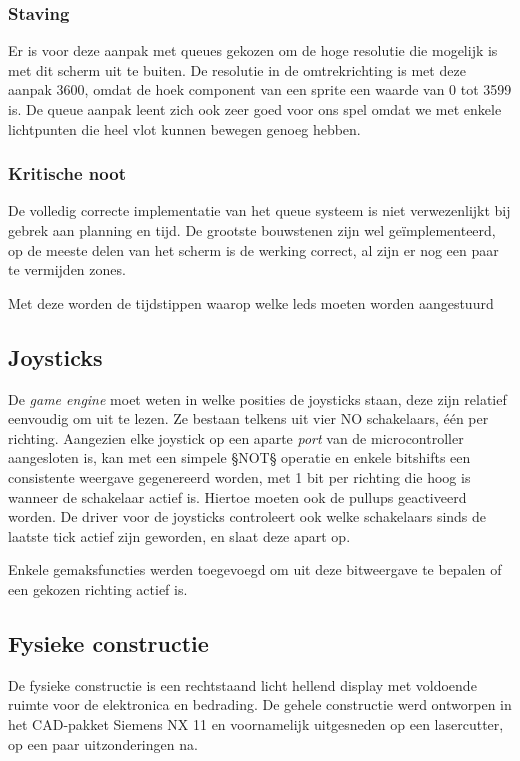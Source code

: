 \documentclass[12pt]{ugentreport}
\begin{document}
\subsubsection{Staving}
Er is voor deze aanpak met queues gekozen om de hoge resolutie die mogelijk is met dit scherm uit te buiten. De resolutie in de 
omtrekrichting is met deze aanpak 3600, omdat de hoek component van een sprite een waarde van 0 tot 3599 is. De queue aanpak leent zich 
ook zeer goed voor ons spel omdat we met enkele lichtpunten die heel vlot kunnen bewegen genoeg hebben.

\subsubsection{Kritische noot}
De volledig correcte implementatie van het queue systeem is niet verwezenlijkt bij gebrek aan planning en tijd. De grootste bouwstenen 
zijn wel geïmplementeerd, op de meeste delen van het scherm is de werking correct, al zijn er nog een paar te vermijden zones.

Met deze worden de tijdstippen waarop welke leds moeten worden aangestuurd 

\subsection{Joysticks}
De \emph{game engine} moet weten in welke posities de joysticks staan,
deze zijn relatief eenvoudig om uit te lezen.
Ze bestaan telkens uit vier NO schakelaars, één per richting.
Aangezien elke joystick op een aparte \emph{port} van de microcontroller
aangesloten is, kan met een simpele §NOT§ operatie en enkele bitshifts een
consistente weergave gegenereerd worden, met 1 bit per richting die hoog is
wanneer de schakelaar actief is. Hiertoe moeten ook de pullups geactiveerd
worden. De driver voor de joysticks controleert ook welke schakelaars sinds de
laatste tick actief zijn geworden, en slaat deze apart op.

Enkele gemaksfuncties werden toegevoegd om uit deze bitweergave te bepalen of
een gekozen richting actief is.

\subsection{Fysieke constructie}
De fysieke constructie is een rechtstaand licht hellend display met voldoende
ruimte voor de elektronica en bedrading. De gehele constructie werd ontworpen
in het CAD-pakket Siemens NX 11 en voornamelijk uitgesneden op een lasercutter,
op een paar uitzonderingen na.
\end{document}
